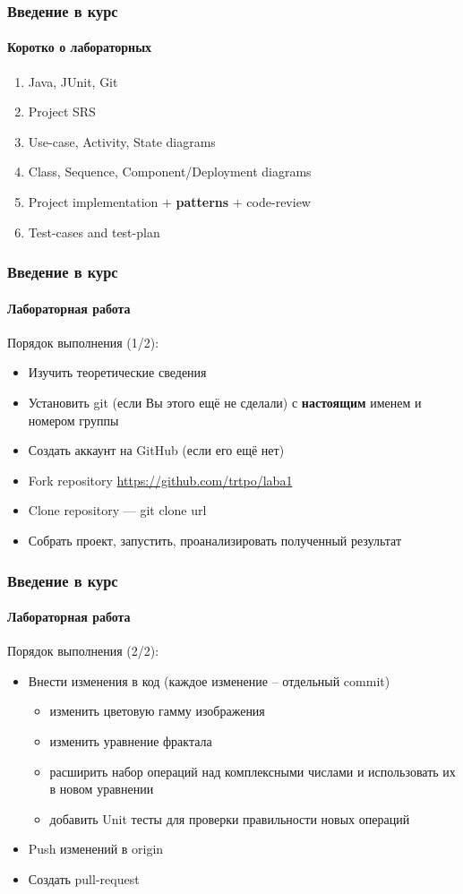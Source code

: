 \documentclass[aspectratio=169, 12pt]{beamer}
\begin{document}
\begin{frame}
    \frametitle{Введение в курс}
    \framesubtitle{Коротко о лабораторных} \pause
    \begin{enumerate}
        \item Java, JUnit, Git \pause
        \item Project SRS \pause
        \item Use-case, Activity, State diagrams \pause
        \item Class, Sequence, Component/Deployment diagrams \pause
        \item Project implementation + \textbf{patterns} + code-review \pause
        \item Test-cases and test-plan
    \end{enumerate}
\end{frame}

\begin{frame}[t]
    \frametitle{Введение в курс}
    \framesubtitle{Лабораторная работа }
    Порядок выполнения (1/2): \pause
    \begin{itemize}
        \item Изучить теоретические сведения \pause
        \item Установить git (если Вы этого ещё не сделали) с \textbf{настоящим} именем и номером группы \pause
        \item Создать аккаунт на GitHub (если его ещё нет) \pause
        \item Fork repository \url{https://github.com/trtpo/laba1} \pause
        \item Clone repository --- git clone url \pause
        \item Собрать проект, запустить, проанализировать полученный результат
    \end{itemize}
\end{frame}

\begin{frame}[t]
    \frametitle{Введение в курс}
    \framesubtitle{Лабораторная работа }
    Порядок выполнения (2/2): \pause
    \begin{itemize}
        \item Внести изменения в код (каждое изменение – отдельный commit) \pause
        \begin{itemize}
            \item изменить цветовую гамму изображения \pause
            \item изменить уравнение фрактала \pause
            \item расширить набор операций над комплексными числами и использовать их в новом уравнении \pause
            \item добавить Unit тесты для проверки правильности новых операций \pause
        \end{itemize}
        \item Push изменений в origin \pause
        \item Создать pull-request
    \end{itemize}
\end{frame}
\end{document}
